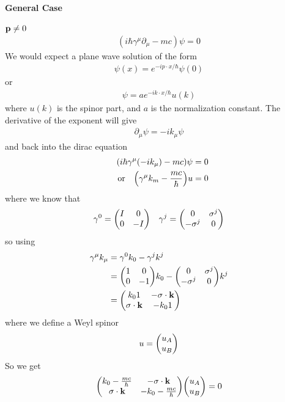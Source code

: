 \documentclass[../main.tex]{subfiles}
\begin{document}
\paragraph*{General Case} $\vb p \neq 0$
\begin{align*}
    (i\hbar \gamma^\mu \partial_\mu - mc) \psi = 0
\end{align*}
We would expect a plane wave solution of the form
\begin{align*}
    \psi(x) = e^{-i p \cdot x/\hbar} \psi(0)
\end{align*}
or
\begin{align*}
    \psi = a e^{-i k \cdot x/\hbar} u(k)
\end{align*}
where $u(k)$ is the spinor part, and $a$ is the normalization constant. The derivative of the exponent 
will give 
\begin{align*}
    \partial_\mu \psi = - ik_\mu \psi 
\end{align*}
and back into the dirac equation
\begin{align*}
    (i\hbar \gamma^\mu (-i k_\mu) - mc) \psi = 0 \\
    \qor \qt(\gamma^\mu k_m - \frac{mc}{\hbar}) u = 0
\end{align*}
where we know that
\begin{align*}
    \gamma^0 = \mqty(I & 0 \\ 0 & -I) \quad \gamma^j = \mqty(0 & \sigma^j \\ -\sigma^j & 0)
\end{align*}
so using 
\begin{align*}
    \gamma^\mu k_\mu &= \gamma^0 k_0 - \gamma^j k^j \\
    &= \mqty(1 & 0 \\ 0 & -1) k_0 - \mqty(0 & \sigma^j \\ -\sigma^j & 0) k^j \\
    &= \mqty(k_0 1 & -\vb \sigma \cdot \vb k \\ \vb \sigma \cdot \vb k & -k_0 1)
\end{align*}
where we define a Weyl spinor
\begin{align*}
    u = \mqty(u_A \\ u_B) 
\end{align*}
So we get
\begin{align*}
    \mqty(k_0 - \frac{mc}{\hbar} & -\vb \sigma \cdot \vb k \\ \vb \sigma \cdot \vb k & -k_0 - \frac{mc}{\hbar}) \mqty(u_A \\ u_B) = 0
\end{align*}
\end{document}

